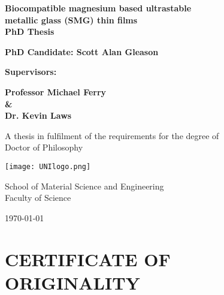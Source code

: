 \documentclass[a4paper,12pt,oneside]{report}%
\begin{document}
\thispagestyle{empty} %
\begin{titlepage}
\begin{center}
\vspace*{1cm}
	
\textbf{\LARGE{Biocompatible magnesium based ultrastable\\ metallic glass (SMG) thin films}}\\
\textbf{PhD Thesis}

\vspace{2cm}

\textbf{\large{PhD Candidate:  Scott Alan Gleason}}

\textbf{Supervisors:}

\textbf{Professor Michael Ferry \\ \& \\ Dr. Kevin Laws}

\vspace{2cm}

A thesis in fulfilment of the requirements for the degree of \\
Doctor of Philosophy

\vspace{1.1cm}

\texttt{[image: UNIlogo.png]}
\label{fig:Unilogo}

\vspace{0.8cm}

School of Material Science and Engineering\\ Faculty of Science

\vspace{2cm}

\today
\end{center}
\end{titlepage}

\clearpage 
{}


\chapter*{CERTIFICATE OF ORIGINALITY}
\end{document}
